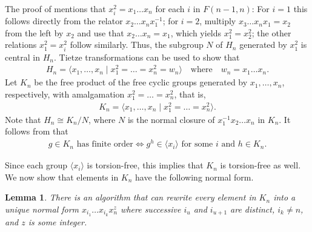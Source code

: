 \documentclass[11pt]{amsart}
\theoremstyle{mythm}
\newtheorem{lemma}[theorem]{Lemma}
\theoremstyle{mydef}
\theoremstyle{myrem}
\numberwithin{equation}{section}
\begin{document}
The proof of \cite[Lemma 4]{DPT} mentions that  $x_i^2=x_1\ldots x_n$ for each $i$ in $F(n-1,n)$: For $i=1$ this follows directly from the relator $x_2\ldots x_nx_1^{-1}$; for $i=2$, multiply $x_3\ldots x_nx_1=x_2$ from the left by $x_2$ and use that $x_2\ldots x_n=x_1$, which yields $x_1^2=x_2^2$; the other relations $x_1^2=x_i^2$ follow similarly.  Thus, the subgroup $N$ of $H_n$ generated by $x_1^2$ is central in $H_n$. Tietze transformations \cite[Section 2.4.4]{handbook} can be used to show that
\begin{align}\label{eq_Hn}H_n=\langle x_1,\ldots,x_{n}\mid x_1^2=\ldots=x_n^2=w_n\rangle\quad\text{where}\quad w_n=x_1\ldots x_n.
\end{align}
Let $K_n$ be the free product of the free cyclic groups generated by $x_1,\ldots, x_n$, respectively, with amalgamation $x_1^2=\ldots=x_n^2$, that is,
\begin{align}\label{eq_Kn}K_n=\langle x_1,\ldots,x_{n}\mid x_1^2=\ldots=x_n^2 \rangle. 
\end{align}
Note that $H_n\cong K_n/N$,  where   $N$ is the normal closure of $x_1^{-1}x_2\ldots x_n$ in $K_n$.   It follows from \cite[Theorem 11.68]{rotman} that
\begin{align}\label{eq_fo} g\in K_n\text{ has finite order} \iff g^h\in \langle x_i \rangle \text{ for some $i$ and $h\in K_n$}.
\end{align}
 
Since each group $\langle x_i\rangle$ is torsion-free, this implies  that  $K_n$ is torsion-free as well. We now show that elements in $K_n$ have the following normal form.
\begin{lemma} \label{lem Kn}
There is an algorithm that can rewrite  every element in $K_n$ into a unique normal form  $x_{i_1}\ldots x_{i_k}x_n^z$ where successive $i_u$ and $i_{u+1}$ are distinct, $i_k\ne n$, and $z$ is some integer. 
\end{lemma}
\end{document}
